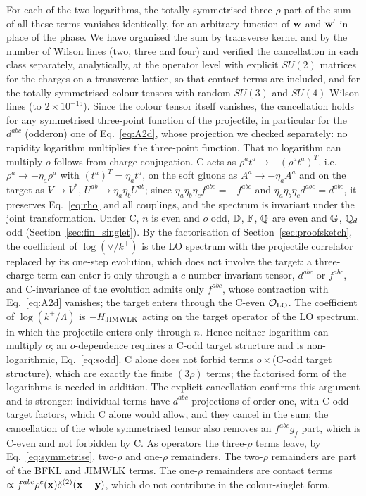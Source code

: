For each of the two logarithms, the totally symmetrised three-$\rho$ part of the sum of all these terms vanishes identically, for an arbitrary function of $\mathbf{w}$ and $\mathbf{w}'$ in place of the phase. We have organised the sum by transverse kernel and by the number of Wilson lines (two, three and four) and verified the cancellation in each class separately, analytically, at the operator level with explicit $SU(2)$ matrices for the charges on a transverse lattice, so that contact terms are included, and for the totally symmetrised colour tensors with random $SU(3)$ and $SU(4)$ Wilson lines (to $2\times10^{-15}$). Since the colour tensor itself vanishes, the cancellation holds for any symmetrised three-point function of the projectile, in particular for the $d^{abc}$ (odderon) one of Eq.~\eqref{eq:A2d}, whose projection we checked separately: no rapidity logarithm multiplies the three-point function. That no logarithm can multiply $o$ follows from charge conjugation. C acts as $\rho^at^a\to-(\rho^at^a)^T$, i.e.\ $\rho^a\to-\eta_a\rho^a$ with $(t^a)^T=\eta_at^a$, on the soft gluons as $A^a\to-\eta_aA^a$ and on the target as $V\to V^*$, $U^{ab}\to\eta_a\eta_bU^{ab}$; since $\eta_a\eta_b\eta_cf^{abc}=-f^{abc}$ and $\eta_a\eta_b\eta_cd^{abc}=d^{abc}$, it preserves Eq.~\eqref{eq:rho} and all couplings, and the spectrum is invariant under the joint transformation. Under C, $n$ is even and $o$ odd, $\mathbb{D}$, $\mathbb{F}$, $\mathbb{Q}$ are even and $\mathbb{G}$, $\mathbb{Q}_d$ odd (Section~\ref{sec:fin_singlet}). By the factorisation of Section~\ref{sec:proofsketch}, the coefficient of $\log(\vee/k^+)$ is the LO spectrum with the projectile correlator replaced by its one-step evolution, which does not involve the target: a three-charge term can enter it only through a $c$-number invariant tensor, $d^{abc}$ or $f^{abc}$, and C-invariance of the evolution admits only $f^{abc}$, whose contraction with Eq.~\eqref{eq:A2d} vanishes; the target enters through the C-even $\mathcal O_{\rm LO}$. The coefficient of $\log(k^+/\Lambda)$ is $-H_{\rm JIMWLK}$ acting on the target operator of the LO spectrum, in which the projectile enters only through $n$. Hence neither logarithm can multiply $o$; an $o$-dependence requires a C-odd target structure and is non-logarithmic, Eq.~\eqref{eq:sodd}. C alone does not forbid terms $o\times$(C-odd target structure), which are exactly the finite $(3\rho)$ terms; the factorised form of the logarithms is needed in addition. The explicit cancellation confirms this argument and is stronger: individual terms have $d^{abc}$ projections of order one, with C-odd target factors, which C alone would allow, and they cancel in the sum; the cancellation of the whole symmetrised tensor also removes an $f^{abc}g_f$ part, which is C-even and not forbidden by C. As operators the three-$\rho$ terms leave, by Eq.~\eqref{eq:symmetrise}, two-$\rho$ and one-$\rho$ remainders. The two-$\rho$ remainders are part of the BFKL and JIMWLK terms. The one-$\rho$ remainders are contact terms $\propto f^{abc}\rho^c(\mathbf{x})\delta^{(2)}(\mathbf{x}-\mathbf{y})$, which do not contribute in the colour-singlet form.

